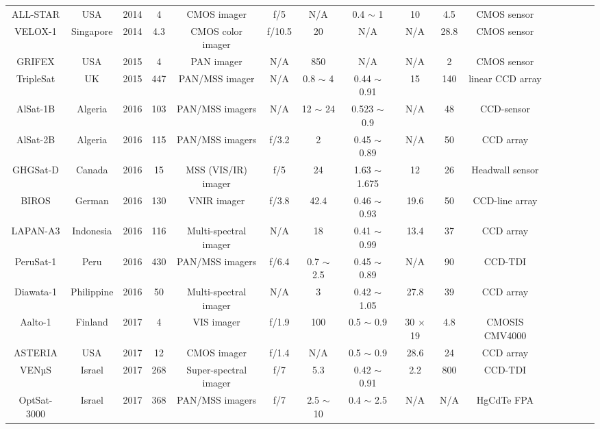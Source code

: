 \documentclass[final,5p,times,twocolumn]{elsarticle}
\begin{document}
\begin{table}
{\begin{tabular}{c c c c c c c c c c c c c c c c}
		    ALL-STAR & USA & 2014 & 4 & CMOS imager & f/5 & N/A & 0.4 $\sim$ 1 &  10 & 4.5 &  CMOS sensor & \citep{eoportal}\\		 
		    VELOX-1 & Singapore & 2014 & 4.3 & CMOS color imager & f/10.5 & 20 & N/A & N/A & 28.8 &  CMOS sensor & \citep{bui2015system}\\		  
		    GRIFEX & USA & 2015 & 4 & PAN imager & N/A & 850 & N/A &  N/A & 2 &  CMOS sensor & \citep{eoportal}   \\
		    TripleSat & UK & 2015 & 447 & PAN/MSS imager & N/A & 0.8 $\sim$ 4 & 0.44 $\sim$ 0.91 & 15 & 140 & linear CCD array &\citep{eoportal}\\		     
		    AlSat-1B & Algeria & 2016 & 103 & PAN/MSS imagers & N/A & 12 $\sim$ 24 & 0.523 $\sim$ 0.9 &  N/A & 48 &  CCD-sensor & \citep{serief2017estimate}\\		      
		    AlSat-2B & Algeria & 2016 & 115 & PAN/MSS imagers & f/3.2 & 2 & 0.45 $\sim$ 0.89 &  N/A & 50 & CCD array & \citep{wahballah2020survey}\\	
		    GHGSat-D & Canada & 2016 & 15 & MSS (VIS/IR) imager & f/5 & 24 & 1.63 $\sim$ 1.675 &  12 & 26 & Headwall sensor & \citep{jervis2021ghgsat}\\	
		    BIROS & German & 2016 & 130 & VNIR imager & f/3.8 & 42.4 & 0.46 $\sim$ 0.93 & 19.6 & 50 & CCD-line array & \citep{lorenz2015remote} \\
		    LAPAN-A3 & Indonesia & 2016 & 116 & Multi-spectral imager & N/A & 18 & 0.41 $\sim$ 0.99 & 13.4 & 37 &  CCD array & \citep{khamsah2019development}\\		    
		    PeruSat-1 & Peru & 2016 & 430 & PAN/MSS imagers & f/6.4 & 0.7 $\sim$ 2.5 & 0.45 $\sim$ 0.89 &  N/A & 90 &  CCD-TDI & \citep{wahballah2020survey}\\	
		    Diawata-1 & Philippine & 2016 & 50 & Multi-spectral imager & N/A & 3 & 0.42 $\sim$ 1.05 &  27.8 & 39 & CCD array & \citep{eoportal}\\	
		    Aalto-1 & Finland & 2017 & 4 & VIS imager & f/1.9 & 100 & 0.5 $\sim$ 0.9 &  30 $\times$ 19 & 4.8 &  CMOSIS CMV4000 & \citep{mughal2021aalto}\\		
		    ASTERIA & USA & 2017 & 12 & CMOS imager & f/1.4 & N/A & 0.5 $\sim$ 0.9 & 28.6 & 24 &  CCD array & \citep{eoportal}\\		    
 		   VENµS & Israel & 2017 & 268 & Super-spectral imager & f/7 & 5.3 & 0.42 $\sim$ 0.91 &  2.2 & 800 &  CCD-TDI & \citep{eoportal}\\	
		    OptSat-3000 & Israel & 2017 & 368 & PAN/MSS imagers & f/7 & 2.5 $\sim$ 10 & 0.4 $\sim$ 2.5 & N/A & N/A &  HgCdTe FPA & \citep{qian2015optical}\\ 		

\end{tabular}}
\end{table}
\end{document}
